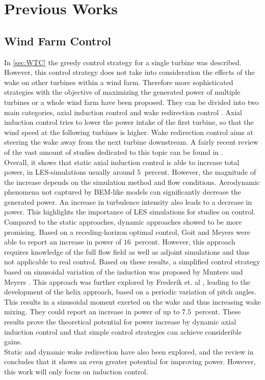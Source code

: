 \section{Previous Works}
\subsection{Wind Farm Control}
In \autoref{sec:WTC} the greedy control strategy for a single turbine was described. However, this control strategy does not take into consideration the effects of the wake on other turbines within a wind farm. Therefore more sophisticated strategies with the objective of maximizing the generated power of multiple turbines or a whole wind farm have been proposed. They can be divided into two main categories, axial induction control and wake redirection control \cite{boersma_tutorial_2017}. 
Axial induction control tries to lower the power intake of the first turbine, so that the wind speed at the following turbines is higher. Wake redirection control aims at steering the wake away from the next turbine downstream. A fairly recent review of the vast amount of studies dedicated to this topic can be found in \cite{kheirabadi_quantitative_2019}. \\
Overall, it shows that static axial induction control is able to increase total power, in LES-simulations usually around $\SI{5}{}$ percent. However, the magnitude of the increase depends on the simulation method and flow conditions. Aerodynamic phenomena not captured by BEM-like models can significantly decrease the generated power. An increase in turbulence intensity also leads to a decrease in power. This highlights the importance of LES simulations for studies on control.
Compared to the static approaches, dynamic approaches showed to be more promising. Based on a receding-horizon optimal control, Goit and Meyers \cite{goit_optimal_2015} were able to report an increase in power of $\SI{16}{}$ percent. However, this approach requires knowledge of the full flow field as well as adjoint simulations and thus not applicable to real control. Based on these results, a simplified control strategy based on sinusoidal variation of the induction was proposed by Munters und Meyers \cite{munters_towards_2018}. This approach was further explored by Frederik et. al \cite{frederik_helix_2020}, leading to the development of the helix approach, based on a periodic variation of pitch angles. This results in a sinusoidal moment exerted on the wake and thus increasing wake mixing. They could report an increase in power of up to $\SI{7.5}{}$ percent. These results prove the theoretical potential for power increase by dynamic axial induction control and that simple control strategies can achieve considerible gains. \\
Static and dynamic wake redirection have also been explored, and the review in \cite{kheirabadi_quantitative_2019} concludes that it shows an even greater potential for improving power. However, this work will only focus on induction control.
